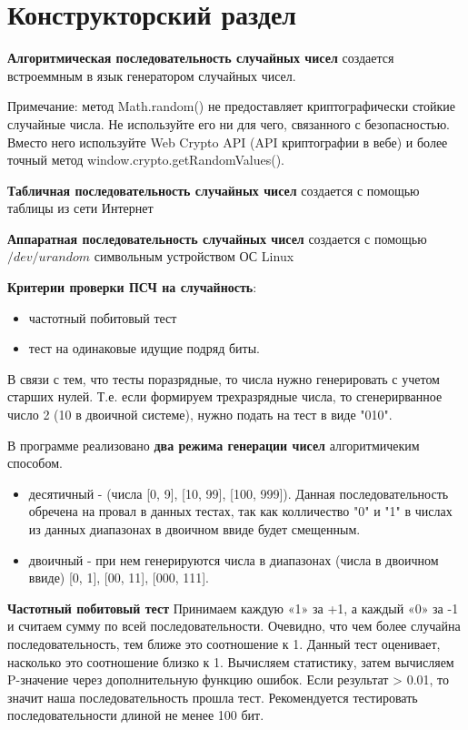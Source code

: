 \chapter{Конструкторский раздел}

\textbf{Алгоритмическая последовательность случайных чисел} создается встроеммным в язык генератором случайных чисел. 

Примечание: метод Math.random() не предоставляет криптографически стойкие случайные числа. Не используйте его ни для чего, связанного с безопасностью. Вместо него используйте Web Crypto API (API криптографии в вебе) и более точный метод window.crypto.getRandomValues().

\textbf{Табличная последовательность случайных чисел} создается с помощью таблицы из сети Интернет\cite{stratum-rand} 

\textbf{Аппаратная последовательность случайных чисел} создается с помощью $/dev/urandom$ символьным устройством ОС Linux \cite{habrahabr-hard-rand} 

\textbf{Критерии проверки ПСЧ на случайность}:
\begin{itemize}
	\item частотный побитовый тест
	\item тест на одинаковые идущие подряд биты.
\end{itemize}

В связи с тем, что тесты поразрядные, то числа нужно генерировать с учетом старших нулей. Т.е. если формируем трехразрядные числа, то сгенерирванное число 2 (10 в двоичной системе), нужно подать на тест в виде "010".  

В программе реализовано \textbf{два режима генерации чисел} алгоритмичеким способом.

\begin{itemize}
	\item десятичный - (числа [0, 9], [10, 99], [100, 999]). Данная последовательность обречена на провал в данных тестах, так как колличество "0" и "1" в числах из данных диапазонах в двоичном ввиде будет смещенным.

	\item двоичный - при нем генерируются числа в диапазонах (числа в двоичном ввиде) [0, 1], [00, 11], [000, 111].
\end{itemize}

\textbf{Частотный побитовый тест}
Принимаем каждую «1» за +1, а каждый «0» за -1 и считаем сумму по всей последовательности.
Очевидно, что чем более случайна последовательность, тем ближе это соотношение к 1. Данный тест оценивает, насколько это соотношение близко к 1. Вычисляем статистику, затем вычисляем P-значение через дополнительную функцию ошибок. Если результат > 0.01, то значит наша последовательность прошла тест. Рекомендуется тестировать последовательности длиной не менее 100 бит. \cite{habrahabr-nist} 

